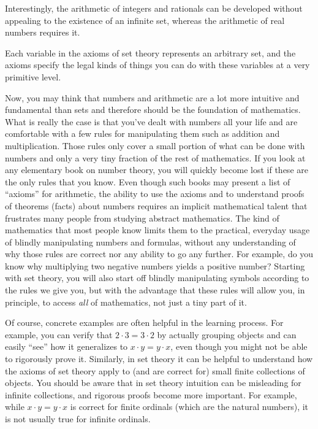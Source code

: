 Interestingly, the arithmetic of integers and
rationals can be developed without appealing to the
existence of an infinite set, whereas the arithmetic of real
numbers requires it.

Each variable in the axioms of set theory
represents an arbitrary set, and the axioms specify the legal kinds of things
you can do with these variables at a very primitive level.

Now, you may think that numbers and arithmetic are a lot more intuitive and
fundamental than sets and therefore should be the foundation of mathematics.
What is really the case is that you've dealt with numbers all your life and
are comfortable with a few rules for manipulating them such as addition and
multiplication.  Those rules only cover a small portion of what can be done
with numbers and only a very tiny fraction of the rest of mathematics.  If you
look at any elementary book on number theory, you will quickly become lost if
these are the only rules that you know.  Even though such books may present a
list of ``axioms'' for arithmetic, the ability to use the axioms
and to understand proofs of theorems (facts) about numbers
requires an implicit mathematical talent that frustrates many people
from studying abstract mathematics.  The kind of mathematics that most people
know limits them to the practical, everyday usage of blindly manipulating
numbers and formulas, without any understanding of why those rules are correct
nor any ability to go any further.  For example, do you know why multiplying
two negative numbers yields a positive number?  Starting with set theory, you
will also start off blindly manipulating symbols according to the rules we give
you, but with the advantage that these rules will allow you, in principle, to
access {\em all} of mathematics, not just a tiny part of it.

Of course, concrete examples are often helpful in the learning process. For
example, you can verify that $2\cdot 3=3 \cdot 2$ by actually grouping
objects and can easily ``see'' how it generalizes to $x\cdot y = y\cdot x$,
even though you might not be able to rigorously prove it.  Similarly, in set
theory it can be helpful to understand how the axioms of set theory apply to
(and are correct for) small finite collections of objects.  You should be aware
that in set theory intuition can be misleading for infinite collections, and
rigorous proofs become more important.  For example, while $x\cdot y = y\cdot
x$ is correct for finite ordinals (which are the natural numbers), it is not
usually true for infinite ordinals.

